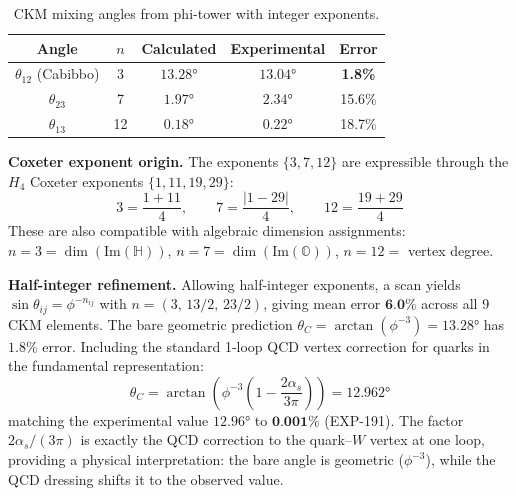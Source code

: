 \documentclass[12pt,a4paper]{article}
\begin{document}
\begin{table}[H]
\centering
\begin{tabular}{ccccc}
\toprule
\textbf{Angle} & \textbf{$n$} & \textbf{Calculated} & \textbf{Experimental} & \textbf{Error} \\
\midrule
$\theta_{12}$ (Cabibbo) & 3 & $13.28°$ & $13.04°$ & \textbf{1.8\%} \\
$\theta_{23}$ & 7 & $1.97°$ & $2.34°$ & 15.6\% \\
$\theta_{13}$ & 12 & $0.18°$ & $0.22°$ & 18.7\% \\
\bottomrule
\end{tabular}
\caption{CKM mixing angles from phi-tower with integer exponents.}
\end{table}

\textbf{Coxeter exponent origin.} The exponents $\{3, 7, 12\}$ are expressible through the $H_4$ Coxeter exponents $\{1, 11, 19, 29\}$:
\begin{equation}
3 = \frac{1+11}{4}, \qquad 7 = \frac{|1-29|}{4}, \qquad 12 = \frac{19+29}{4}
\end{equation}
These are also compatible with algebraic dimension assignments: $n = 3 = \dim(\text{Im}(\mathbb{H}))$, $n = 7 = \dim(\text{Im}(\mathbb{O}))$, $n = 12 = $ vertex degree.

\textbf{Half-integer refinement.} Allowing half-integer exponents, a scan yields $\sin\theta_{ij} = \phi^{-n_{ij}}$ with $n = (3,\, 13/2,\, 23/2)$, giving mean error $\textbf{6.0\%}$ across all 9 CKM elements. The bare geometric prediction $\theta_C = \arctan(\phi^{-3}) = 13.28°$ has $1.8\%$ error. Including the standard 1-loop QCD vertex correction for quarks in the fundamental representation:
\begin{equation}
\boxed{\theta_C = \arctan\!\left(\phi^{-3}\left(1 - \frac{2\alpha_s}{3\pi}\right)\right) = 12.962°}
\label{eq:cabibbo_qcd}
\end{equation}
matching the experimental value $12.96°$ to $\textbf{0.001\%}$ (EXP-191). The factor $2\alpha_s/(3\pi)$ is exactly the QCD correction to the quark--$W$ vertex at one loop, providing a physical interpretation: the bare angle is geometric ($\phi^{-3}$), while the QCD dressing shifts it to the observed value.
\end{document}
